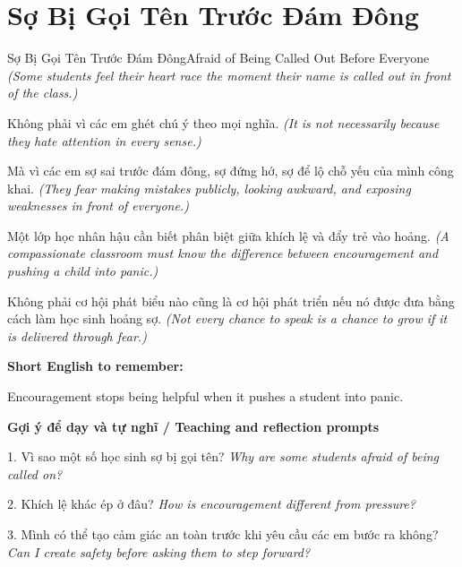 \section{Sợ Bị Gọi Tên Trước Đám Đông}
\begin{truyen}{Sợ Bị Gọi Tên Trước Đám Đông}{Afraid of Being Called Out Before Everyone}
\textit{(Some students feel their heart race the moment their name is called out in front of the class.)}

Không phải vì các em ghét chú ý theo mọi nghĩa.
\textit{(It is not necessarily because they hate attention in every sense.)}

Mà vì các em sợ sai trước đám đông, sợ đứng hớ, sợ để lộ chỗ yếu của mình công khai.
\textit{(They fear making mistakes publicly, looking awkward, and exposing weaknesses in front of everyone.)}

Một lớp học nhân hậu cần biết phân biệt giữa khích lệ và đẩy trẻ vào hoảng.
\textit{(A compassionate classroom must know the difference between encouragement and pushing a child into panic.)}

\end{truyen}

\begin{baihoc}
Không phải cơ hội phát biểu nào cũng là cơ hội phát triển nếu nó được đưa bằng cách làm học sinh hoảng sợ.
\textit{(Not every chance to speak is a chance to grow if it is delivered through fear.)}
\end{baihoc}

\begin{ghinhoanh}
\textbf{Short English to remember:}

Encouragement stops being helpful when it pushes a student into panic.

\end{ghinhoanh}

\begin{tuhocnhanh}
\textbf{Gợi ý để dạy và tự nghĩ / Teaching and reflection prompts}

1. Vì sao một số học sinh sợ bị gọi tên? \textit{Why are some students afraid of being called on?}

2. Khích lệ khác ép ở đâu? \textit{How is encouragement different from pressure?}

3. Mình có thể tạo cảm giác an toàn trước khi yêu cầu các em bước ra không? \textit{Can I create safety before asking them to step forward?}
\end{tuhocnhanh}
\ngancach

